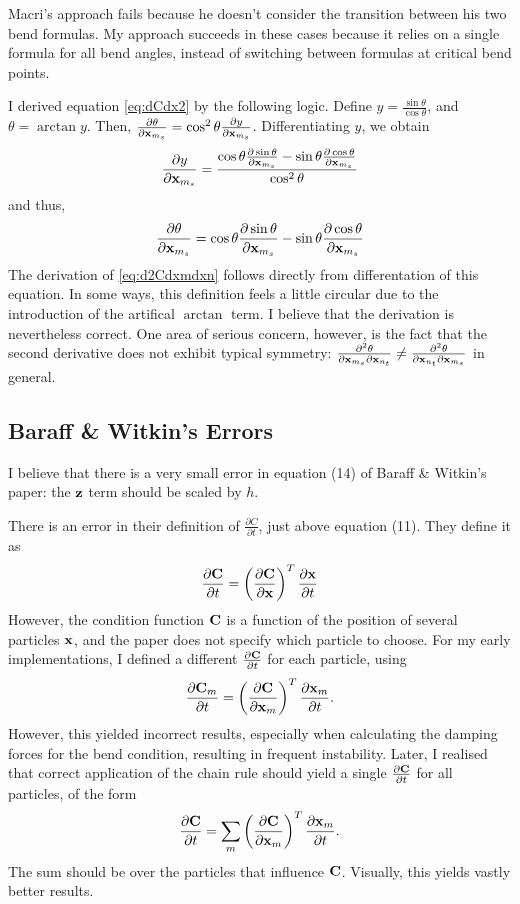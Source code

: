 \documentclass[twocolumn]{article}
\newcommand{\pfrac}[2]{
    \frac{\partial #1}{\partial #2}
}
\newcommand{\pfractwo}[3]{
    \frac{\partial^2 #1}{\partial #2 \partial #3}
}
\newcommand{\x}{{\bf x}}
\newcommand{\xm}{\x_m}
\newcommand{\xms}{\x_{m_s}}
\newcommand{\xnt}{\x_{n_t}}
\newcommand{\z}{{\bf z}}
\begin{document}
Macri's approach fails because he doesn't consider the transition between
his two bend formulas. My approach succeeds in these cases because it relies
on a single formula for all bend angles, instead of switching between
formulas at critical bend points.

I derived equation \eqref{eq:dCdx2} by the following logic. Define
$y=\frac{\sin\theta}{\cos \theta}$, and $\theta = \arctan y$. Then, $\pfrac{\theta}{\xms}=\cos^2\theta\pfrac{y}{\xms}$. Differentiating $y$, we obtain 
\[ \pfrac{y}{\xms}=\frac{\cos\theta\pfrac{\sin\theta}{\xms}-\sin\theta\pfrac{\cos\theta}{\xms}}{\cos^2\theta} \]
and thus,
\[\pfrac{\theta}{\xms} = \cos\theta\pfrac{\sin\theta}{\xms}-\sin\theta\pfrac{\cos\theta}{\xms} \]
The derivation of \eqref{eq:d2Cdxmdxn} follows directly from differentation of
this equation. In some ways, this definition feels a little circular due to
the introduction of the artifical $\arctan$ term. I believe that the
derivation is nevertheless correct. One area of serious concern, however, is
the fact that the second derivative does not exhibit typical symmetry:
$\pfractwo{\theta}{\xms}{\xnt} \neq \pfractwo{\theta}{\xnt}{\xms}$ in general.

\subsection{Baraff \& Witkin's Errors}

I believe that there is a very small error in equation (14) of Baraff \&
Witkin's paper: the $\z$ term should be scaled by $h$.

There is an error in their definition of $\pfrac{C}{t}$, just above equation
(11). They define it as
\[ \pfrac{\bf C}{t} = \left(\pfrac{\bf C}{\x}\right)^T \pfrac{\x}{t} \]
However, the condition function ${\bf C}$ is a function of the position of
several particles ${\bf x}$, and the paper does not specify which particle to
choose. For my early implementations, I defined a different $\pfrac{\bf C}{t}$
for each particle, using
\[ \pfrac{{\bf C}_m}{t} = \left(\pfrac{\bf C}{\xm}\right)^T \pfrac{\xm}{t}. \]
However, this yielded incorrect results, especially when calculating the
damping forces for the bend condition, resulting in frequent instability.
Later, I realised that correct application of the chain rule should yield
a single $\pfrac{\bf C}{t}$ for all particles, of the form
\begin{align}
\pfrac{\bf C}{t} = \sum_m\left(\pfrac{\bf C}{\xm}\right)^T \pfrac{\xm}{t}.
\end{align}
The sum should be over the particles that influence ${\bf C}$. Visually, this
yields vastly better results.
\end{document}
